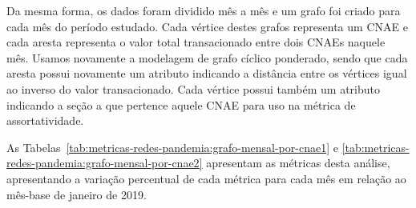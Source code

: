 Da mesma forma, os dados foram dividido mês a mês e um grafo foi criado para cada mês do período estudado. Cada vértice destes grafos representa um CNAE e cada aresta representa o valor total transacionado entre dois CNAEs naquele mês. Usamos novamente a modelagem de grafo cíclico ponderado, sendo que cada aresta possui novamente um atributo indicando a distância entre os vértices igual ao inverso do valor transacionado. Cada vértice possui também um atributo indicando a seção a que pertence aquele CNAE para uso na métrica de assortatividade.

As Tabelas~\ref{tab:metricas-redes-pandemia:grafo-mensal-por-cnae1} e \ref{tab:metricas-redes-pandemia:grafo-mensal-por-cnae2} apresentam as métricas desta análise, apresentando a variação percentual de cada métrica para cada mês em relação ao mês-base de janeiro de 2019.

